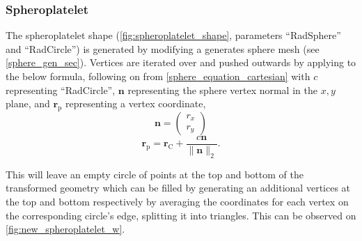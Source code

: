 \subsubsection{Spheroplatelet}
The spheroplatelet shape (\cref{fig:spheroplatelet_shape}, parameters ``RadSphere'' and ``RadCircle'') is generated by modifying a generates sphere mesh (see \cref{sphere_gen_sec}). Vertices are iterated over and pushed outwards by applying to the below formula, following on from \cref{sphere_equation_cartesian} with $c$ representing ``RadCircle'', $\mathbf{n}$ representing the sphere vertex normal in the $x,y$ plane, and $\mathbf{r}_\mathrm{p}$ representing a vertex coordinate,
\begin{equation}
\mathbf{n}=\begin{pmatrix}
  r_x\\
  r_y
\end{pmatrix}
\end{equation}
\begin{equation}
\mathbf{r}_\mathrm{p}=\mathbf{r}_\mathrm{C} + \frac{c\mathbf{n}}{\|\mathbf{n}\|_2}.
\end{equation}

This will leave an empty circle of points at the top and bottom of the transformed geometry which can be filled by generating an additional vertices at the top and bottom respectively by averaging the coordinates for each vertex on the corresponding circle's edge, splitting it into triangles. This can be observed on \cref{fig:new_spheroplatelet_w}.

